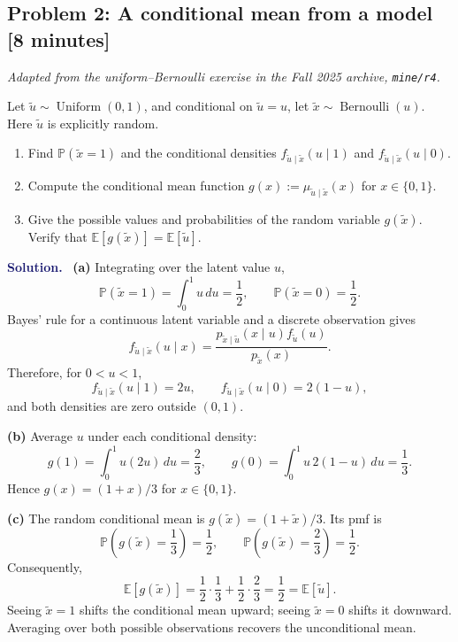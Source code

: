 \documentclass[11pt]{article}
\newcommand{\Pbb}{\mathbb{P}}
\newcommand{\E}{\mathbb{E}}
\newcommand{\rv}[1]{\widetilde{#1}}
\newenvironment{answer}{%
    \par\medskip\noindent\textcolor{MidnightBlue}{\textbf{Solution.}}\ }
    {\par\medskip}
\newcommand{\workingspace}[1]{}
\newcommand{\workingspace}[1]{\vspace{#1}}
\begin{document}
\newpage
\subsection*{Problem 2: A conditional mean from a model \hfill [8 minutes]}
\noindent\textit{Adapted from the uniform--Bernoulli exercise in the
Fall 2025 archive, \texttt{mine/r4}.}

\medskip
Let $\rv{u}\sim\operatorname{Uniform}(0,1)$, and conditional on
$\rv{u}=u$, let $\rv{x}\sim\operatorname{Bernoulli}(u)$.
Here $\rv{u}$ is explicitly random.
\begin{enumerate}
  \item Find $\Pbb(\rv{x}=1)$ and the conditional densities
    $f_{\rv{u}\mid\rv{x}}(u\mid1)$ and
    $f_{\rv{u}\mid\rv{x}}(u\mid0)$.
  \item Compute the conditional mean function
    $g(x):=\mu_{\rv{u}\mid\rv{x}}(x)$ for $x\in\{0,1\}$.
  \item Give the possible values and probabilities of the random variable
    $g(\rv{x})$. Verify that $\E[g(\rv{x})]=\E[\rv{u}]$.
\end{enumerate}
\workingspace{8cm}

\begin{answer}
\textbf{(a)} Integrating over the latent value $u$,
\[
  \Pbb(\rv{x}=1)=\int_0^1 u\,du=\frac12,
  \qquad \Pbb(\rv{x}=0)=\frac12.
\]
Bayes' rule for a continuous latent variable and a discrete observation gives
\[
  f_{\rv{u}\mid\rv{x}}(u\mid x)
  =\frac{p_{\rv{x}\mid\rv{u}}(x\mid u)f_{\rv{u}}(u)}
         {p_{\rv{x}}(x)}.
\]
Therefore, for $0<u<1$,
\[
  \boxed{f_{\rv{u}\mid\rv{x}}(u\mid1)=2u,
  \qquad f_{\rv{u}\mid\rv{x}}(u\mid0)=2(1-u),}
\]
and both densities are zero outside $(0,1)$.

\textbf{(b)} Average $u$ under each conditional density:
\[
  g(1)=\int_0^1u(2u)\,du=\frac23,
  \qquad
  g(0)=\int_0^1u\,2(1-u)\,du=\frac13.
\]
Hence $\boxed{g(x)=(1+x)/3}$ for $x\in\{0,1\}$.

\textbf{(c)} The random conditional mean is
$g(\rv{x})=(1+\rv{x})/3$. Its pmf is
\[
  \Pbb\!\left(g(\rv{x})=\frac13\right)=\frac12,
  \qquad
  \Pbb\!\left(g(\rv{x})=\frac23\right)=\frac12.
\]
Consequently,
\[
  \E[g(\rv{x})]
  =\frac12\cdot\frac13+\frac12\cdot\frac23
  =\boxed{\frac12}=\E[\rv{u}].
\]
Seeing $\rv{x}=1$ shifts the conditional mean upward; seeing $\rv{x}=0$
shifts it downward. Averaging over both possible observations recovers the
unconditional mean.
\end{answer}
\end{document}
